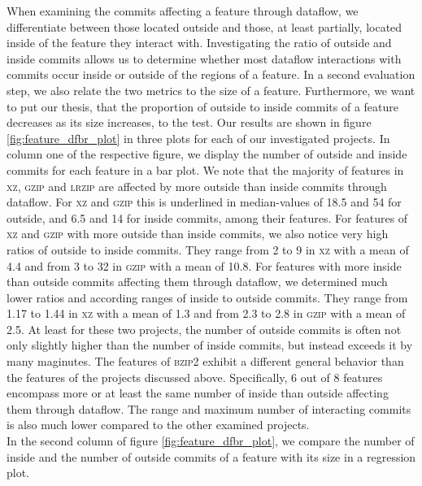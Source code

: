 When examining the commits affecting a feature through dataflow, we differentiate between those located outside and those, at least partially, located inside of the feature they interact with.
Investigating the ratio of outside and inside commits allows us to determine whether most dataflow interactions with commits occur inside or outside of the regions of a feature.
In a second evaluation step, we also relate the two metrics to the size of a feature.
Furthermore, we want to put our thesis, that the proportion of outside to inside commits of a feature decreases as its size increases, to the test.
Our results are shown in figure \ref{fig:feature_dfbr_plot} in three plots for each of our investigated projects.
In column one of the respective figure, we display the number of outside and inside commits for each feature in a bar plot.
We note that the majority of features in \textsc{xz}, \textsc{gzip} and \textsc{lrzip} are affected by more outside than inside commits through dataflow.
For \textsc{xz} and \textsc{gzip} this is underlined in median-values of 18.5 and 54 for outside, and 6.5 and 14 for inside commits, among their features.
For features of \textsc{xz} and \textsc{gzip} with more outside than inside commits, we also notice very high ratios of outside to inside commits.
They range from 2 to 9 in \textsc{xz} with a mean of 4.4 and from 3 to 32 in \textsc{gzip} with a mean of 10.8.
For features with more inside than outside commits affecting them through dataflow, we determined much lower ratios and according ranges of inside to outside commits.
They range from 1.17 to 1.44 in \textsc{xz} with a mean of 1.3 and from 2.3 to 2.8 in \textsc{gzip} with a mean of 2.5.
At least for these two projects, the number of outside commits is often not only slightly higher than the number of inside commits, but instead exceeds it by many maginutes.
The features of \textsc{bzip2} exhibit a different general behavior than the features of the projects discussed above.
Specifically, 6 out of 8 features encompass more or at least the same number of inside than outside affecting them through dataflow.
The range and maximum number of interacting commits is also much lower compared to the other examined projects. \\
In the second column of figure \ref{fig:feature_dfbr_plot}, we compare the number of inside and the number of outside commits of a feature with its size in a regression plot.
